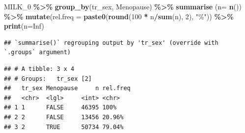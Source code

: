 \documentclass[
]{article}
\newenvironment{Shaded}{\begin{snugshade}}{\end{snugshade}}
\newcommand{\DataTypeTok}[1]{\textcolor[rgb]{0.13,0.29,0.53}{#1}}
\newcommand{\DecValTok}[1]{\textcolor[rgb]{0.00,0.00,0.81}{#1}}
\newcommand{\KeywordTok}[1]{\textcolor[rgb]{0.13,0.29,0.53}{\textbf{#1}}}
\newcommand{\NormalTok}[1]{#1}
\newcommand{\OperatorTok}[1]{\textcolor[rgb]{0.81,0.36,0.00}{\textbf{#1}}}
\newcommand{\OtherTok}[1]{\textcolor[rgb]{0.56,0.35,0.01}{#1}}
\newcommand{\StringTok}[1]{\textcolor[rgb]{0.31,0.60,0.02}{#1}}
\begin{document}
\begin{Shaded}
\begin{Highlighting}[]
\NormalTok{MILK\_}\DecValTok{0} \OperatorTok{\%\textgreater{}\%}\StringTok{ }
\StringTok{  }\KeywordTok{group\_by}\NormalTok{(tr\_sex, Menopause) }\OperatorTok{\%\textgreater{}\%}\StringTok{ }
\StringTok{  }\KeywordTok{summarise}\NormalTok{ (}\DataTypeTok{n=} \KeywordTok{n}\NormalTok{()) }\OperatorTok{\%\textgreater{}\%}
\StringTok{  }\KeywordTok{mutate}\NormalTok{(}\DataTypeTok{rel.freq =} \KeywordTok{paste0}\NormalTok{(}\KeywordTok{round}\NormalTok{(}\DecValTok{100} \OperatorTok{*}\StringTok{ }\NormalTok{n}\OperatorTok{/}\KeywordTok{sum}\NormalTok{(n), }\DecValTok{2}\NormalTok{), }\StringTok{"\%"}\NormalTok{))  }\OperatorTok{\%\textgreater{}\%}\StringTok{ }
\StringTok{  }\KeywordTok{print}\NormalTok{(}\DataTypeTok{n=}\OtherTok{Inf}\NormalTok{)}
\end{Highlighting}
\end{Shaded}

\begin{verbatim}
## `summarise()` regrouping output by 'tr_sex' (override with `.groups` argument)
\end{verbatim}

\begin{verbatim}
## # A tibble: 3 x 4
## # Groups:   tr_sex [2]
##   tr_sex Menopause     n rel.freq
##   <chr>  <lgl>     <int> <chr>   
## 1 1      FALSE     46395 100%    
## 2 2      FALSE     13456 20.96%  
## 3 2      TRUE      50734 79.04%
\end{verbatim}
\end{document}
